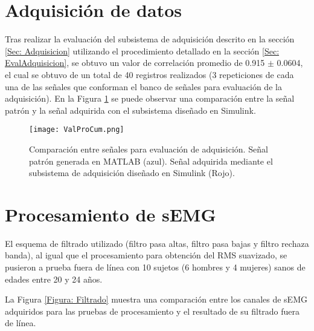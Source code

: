 
\section{Adquisición de datos}
Tras realizar la evaluación del subsistema de adquisición descrito en la sección \ref{Sec: Adquisicion} utilizando el procedimiento detallado en la sección \ref{Sec: EvalAdquisicion}, se obtuvo un valor de correlación promedio de 0.915 $\pm$ 0.0604, el cual se obtuvo de un total de 40 registros realizados (3 repeticiones de cada una de las señales que conforman el banco de señales para evaluación de la adquisición). En la Figura \ref{Figura: ValProCum} se puede observar una comparación entre la señal patrón y la señal adquirida con el subsistema diseñado en Simulink.



\begin{figure}[htbp]
	\centering
	\texttt{[image: ValProCum.png]}
	\caption[Comparación entre señales para evaluación de adquisición.]{Comparación entre señales para evaluación de adquisición. Señal patrón generada en MATLAB (azul). Señal adquirida mediante el subsistema de adquisición diseñado en Simulink (Rojo).}
	\label{Figura: ValProCum}
\end{figure}


\section{Procesamiento de sEMG}
El esquema de filtrado utilizado (filtro pasa altas, filtro pasa bajas y filtro rechaza banda), al igual que el procesamiento para obtención del RMS suavizado, se pusieron a prueba fuera de línea con 10 sujetos (6 hombres y 4 mujeres) sanos de edades entre 20 y 24 años.

La Figura \ref{Figura: Filtrado} muestra una comparación entre los canales de sEMG adquiridos para las pruebas de procesamiento y el resultado de su filtrado fuera de línea.

